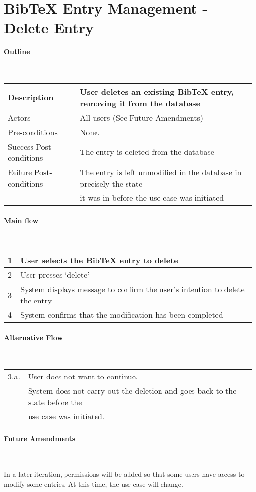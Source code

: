 \section*{BibTeX Entry Management - Delete Entry} %

\paragraph*{Outline} \

\begin{tabular}{ | l | l | }
\hline
Description & User deletes an existing BibTeX entry, removing it from the database \\ \hline
Actors & All users (See Future Amendments) \\ \hline
Pre-conditions & None. \\ \hline
Success Post-conditions & The entry is deleted from the database \\ \hline
Failure Post-conditions & The entry is left unmodified in the database in precisely the state \\
 & it was in before the use case was initiated\\ \hline
\end{tabular}


\paragraph*{Main flow} \

\begin{tabular}{ | l | l | } \hline
1 & User selects the BibTeX entry to delete \\ \hline
2 & User presses `delete' \\ \hline
3 & System displays message to confirm the user's intention to delete the entry \\ \hline
4 & System confirms that the modification has been completed \\ \hline
\end{tabular}


\paragraph*{Alternative Flow} \

\begin{tabular}{ | l | l | } \hline
3.a. & User does not want to continue. \\
     & System does not carry out the deletion and goes back to the state before the \\
 & use case was initiated. \\ \hline
\end{tabular}

\paragraph*{Future Amendments} \

In a later iteration, permissions will be added so that some users have access to modify some entries. At this time, the use case will change.

